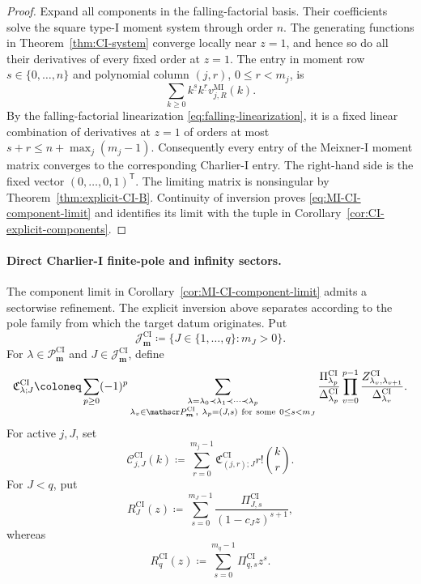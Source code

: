 \documentclass[10pt]{amsart}
\newcommand{\mm}{\boldsymbol m}
\newcommand{\fall}[2]{#1^{\underline{#2}}}
\theoremstyle{plain}
\theoremstyle{definition}
\theoremstyle{remark}
\begin{document}
\begin{proof}
Expand all components in the falling-factorial basis. Their coefficients
solve the square type-I moment system through order \(n\). The generating
functions in Theorem~\ref{thm:CI-system} converge locally near \(z=1\),
and hence so do all their derivatives of every fixed order at \(z=1\).
The entry in moment row \(s\in\{0,\ldots,n\}\) and polynomial column
\((j,r)\), \(0\le r<m_j\), is
\[
 \sum_{k\ge0}\fall{k}{s}\fall{k}{r}v_{j,R}^{\mathrm{MI}}(k).
\]
By the falling-factorial linearization
\eqref{eq:falling-linearization}, it is a fixed linear combination of
derivatives at \(z=1\) of orders at most
\(s+r\le n+\max_j(m_j-1)\). Consequently every entry of the
Meixner-I moment matrix converges to the corresponding Charlier-I
entry. The right-hand side is the fixed vector
\((0,\ldots,0,1)^{\mathsf T}\). The limiting matrix is nonsingular by
Theorem~\ref{thm:explicit-CI-B}. Continuity of inversion proves
\eqref{eq:MI-CI-component-limit} and identifies its limit with the tuple
in Corollary~\ref{cor:CI-explicit-components}.
\end{proof}

\paragraph{Direct Charlier-I finite-pole and infinity sectors.}
The component limit in Corollary~\ref{cor:MI-CI-component-limit} admits a
sectorwise refinement. The explicit inversion above separates according to the pole family
from which the target datum originates. Put
\[
 \mathcal J_{\mm}^{\mathrm{CI}}
 \coloneq\{J\in\{1,\ldots,q\}:m_J>0\}.
\]
For \(\lambda\in\mathscr P_{\boldsymbol m}^{\mathrm{CI}}\) and
\(J\in\mathcal J_{\mm}^{\mathrm{CI}}\), define
\begin{equation}
 \mathfrak C_{\lambda;J}^{\mathrm{CI}}
 \coloneq
 \sum_{p\ge0}(-1)^p
 \sum_{\substack{\lambda=\lambda_0\prec\lambda_1\prec\cdots\prec\lambda_p\\
                  \lambda_v\in\mathscr P_{\boldsymbol m}^{\mathrm{CI}},\
                  \lambda_p=(J,s)\ {\rm for\ some}\ 0\le s<m_J}}
 \frac{\Pi_{\lambda_p}^{\mathrm{CI}}}
      {\Delta_{\lambda_p}^{\mathrm{CI}}}
 \prod_{v=0}^{p-1}
 \frac{Z_{\lambda_v,\lambda_{v+1}}^{\mathrm{CI}}}
      {\Delta_{\lambda_v}^{\mathrm{CI}}}.
 \label{eq:CI-sector-path-coefficients}
\end{equation}
For active \(j,J\), set
\begin{equation}
 \mathscr C_{j,J}^{\mathrm{CI}}(k)
 \coloneq\sum_{r=0}^{m_j-1}
 \mathfrak C_{(j,r);J}^{\mathrm{CI}}r!\binom{k}{r}.
 \label{eq:CI-direct-sector-block}
\end{equation}
For \(J<q\), put
\[
 R_J^{\mathrm{CI}}(z)\coloneq
 \sum_{s=0}^{m_J-1}
 \frac{\Pi_{J,s}^{\mathrm{CI}}}{(1-c_Jz)^{s+1}},
\]
whereas
\[
 R_q^{\mathrm{CI}}(z)\coloneq
 \sum_{s=0}^{m_q-1}\Pi_{q,s}^{\mathrm{CI}}z^s .
\]
\end{document}
